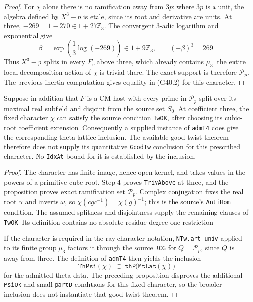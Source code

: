 \begin{proof}
For $\chi$ alone there is no ramification away from
$3p$: where $3p$ is a unit, the algebra defined by
$X^3-p$ is etale, since its root and derivative are
units.  At three, $-269=1-270\in1+27\mathbb Z_3$.
The convergent $3$-adic logarithm and exponential
give
\[
       \beta=\exp\!\left(\frac13\log(-269)\right)
                   \in1+9\mathbb Z_3,\qquad
       (-\beta)^3=269.
\]
Thus $X^3-p$ splits in every $F_v$ above three,
which already contains $\mu_3$; the entire local
decomposition action of $\chi$ is trivial there.
The exact support is therefore $\mathcal P_p$.
The previous inertia computation gives equality
in (G40.2) for this character.
\end{proof}

\begin{corollary}
\label{AC-G40-inclusion}
Suppose in addition that $F$ is a CM host with every
prime in $\mathcal P_p$ split over its maximal real
subfield and disjoint from the source set $S_0$.
At coefficient three, the fixed character $\chi$
can satisfy the source condition \texttt{TwOK},
after choosing its cubic-root coefficient extension.
Consequently a supplied instance of \texttt{admT4}
does give the corresponding theta-lattice inclusion.
The available good-twist theorem therefore does
not supply its quantitative \texttt{GoodTw} conclusion
for this prescribed character.  No \texttt{IdxAt}
bound for it is established by the inclusion.
\end{corollary}
\begin{proof}
The character has finite image, hence open kernel,
and takes values in the powers of a primitive cube
root.  Step 4 proves \texttt{TrivAbove} at three,
and the proposition proves exact ramification set
$\mathcal P_p$.  Complex conjugation fixes the
real root $\alpha$ and inverts $\omega$, so
$\chi(cgc^{-1})=\chi(g)^{-1}$; this is the source's
\texttt{AntiHom} condition.  The assumed splitness
and disjointness supply the remaining clauses of
\texttt{TwOK}.  Its definition contains no
absolute residue-degree-one restriction.

If the character is required in the ray-character
notation, \texttt{NTw.art\_univ} applied to its finite
group $\mu_3$ factors it through the source
\texttt{RCG} for $Q=\mathcal P_p$, since $Q$ is
away from three.  The definition of \texttt{admT4}
then yields the inclusion
\[
       \texttt{ThPsi}(\chi)
           \ \subset\
       \texttt{thP}\bigl(\texttt{MtLat}(\chi)\bigr)
                                                               \tag{G40.4}
\]
for the admitted theta data.
The preceding proposition disproves the additional
\texttt{PsiOk} and small-\texttt{partD} conditions
for this fixed character, so the broader inclusion
does not instantiate that good-twist theorem.
\end{proof}

